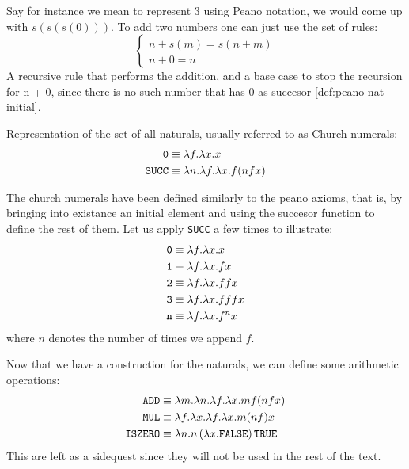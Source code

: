 \documentclass[12pt]{book}
\begin{document}
Say for instance we mean to represent $ 3 $ using Peano notation, we would come up with $ s(s(s(0))) $. To add two numbers one can just use the set of rules:
\[
  \begin{cases}
    n + s(m) = s(n + m) \\
    n + 0 = n
  \end{cases}
\]
A recursive rule that performs the addition, and a base case to stop the recursion for n + 0, since there is no such number that has $ 0 $ as succesor \ref{def:peano-nat-initial}.
\begin{definition} Representation of the set of all naturals, usually referred to as Church numerals:
  \label{def:church-naturals}
  \begin{align*}
    \texttt{0} &\equiv \lambda f.\lambda x. x \\
    \texttt{SUCC} &\equiv \lambda n. \lambda f. \lambda x . f ( n f x )
  \end{align*}

\end{definition}
\begin{remark}
  The church numerals have been defined similarly to the peano axioms, that is, by bringing into existance an initial element and using the succesor function to define the rest of them. Let us apply \texttt{SUCC} a few times to illustrate:
  \begin{align*}
    \texttt{0} &\equiv \lambda f.\lambda x. x \\
    \texttt{1} &\equiv \lambda f.\lambda x. f x \\
    \texttt{2} &\equiv \lambda f.\lambda x. f f x \\
    \texttt{3} &\equiv \lambda f.\lambda x. f f f x \\
    \texttt{n} &\equiv \lambda f.\lambda x. f ^ n x
  \end{align*}
  where $ n $ denotes the number of times we append $ f $.
\end{remark}
Now that we have a construction for the naturals, we can define some arithmetic operations:
\begin{align*}
  \texttt{ADD} &\equiv \lambda m.\lambda n. \lambda f. \lambda x. m f ( n f x) \\
  \texttt{MUL} &\equiv \lambda f.\lambda x. \lambda f. \lambda x. m (n f) x \\
  \texttt{ISZERO} &\equiv \lambda n. n\,(\lambda x.\texttt{FALSE})\,\texttt{TRUE}
\end{align*}
This are left as a sidequest since they will not be used in the rest of the text.
\end{document}
